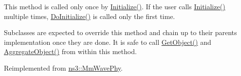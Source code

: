This method is called only once by \hyperlink{classns3_1_1Object_af4411cb29971772fcd09203474a95078}{Initialize()}. If the user calls \hyperlink{classns3_1_1Object_af4411cb29971772fcd09203474a95078}{Initialize()} multiple times, \hyperlink{classns3_1_1MmWaveEnbPhy_ad591594eeb17ea029240b75c9f578578}{Do\+Initialize()} is called only the first time.

Subclasses are expected to override this method and chain up to their parent\textquotesingle{}s implementation once they are done. It is safe to call \hyperlink{classns3_1_1Object_a13e18c00017096c8381eb651d5bd0783}{Get\+Object()} and \hyperlink{classns3_1_1Object_a79dd435d300f3deca814553f561a2922}{Aggregate\+Object()} from within this method. 

Reimplemented from \hyperlink{classns3_1_1MmWavePhy_a4a5afbb66250562604dca60368ab187b}{ns3\+::\+Mm\+Wave\+Phy}.


